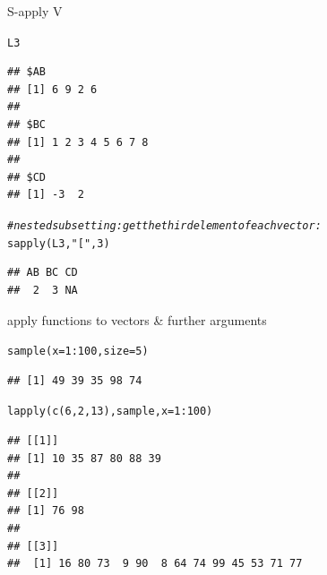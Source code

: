 \documentclass[xcolor=table,       handout,    xcolor=dvipsnames]{beamer}\usepackage[]{graphicx}\usepackage[]{color}
\makeatletter
\newcommand{\hlnum}[1]{\textcolor[rgb]{0,0,0}{#1}}
\newcommand{\hlstr}[1]{\textcolor[rgb]{0.545,0.137,0.137}{#1}}
\newcommand{\hlcom}[1]{\textcolor[rgb]{0,0.392,0}{\textit{#1}}}
\newcommand{\hlopt}[1]{\textcolor[rgb]{0,0,0}{#1}}
\newcommand{\hlstd}[1]{\textcolor[rgb]{0,0,0}{#1}}
\newcommand{\hlkwc}[1]{\textcolor[rgb]{1,0,1}{#1}}
\newcommand{\hlkwd}[1]{\textcolor[rgb]{0,0,1}{#1}}
\newenvironment{kframe}{%
 \def\at@end@of@kframe{}%
 \ifinner\ifhmode%
  \def\at@end@of@kframe{\end{minipage}}%
  \begin{minipage}{\columnwidth}%
 \fi\fi%
 \def\FrameCommand##1{\hskip\@totalleftmargin \hskip-\fboxsep
 \colorbox{shadecolor}{##1}\hskip-\fboxsep
     \hskip-\linewidth \hskip-\@totalleftmargin \hskip\columnwidth}%
 \MakeFramed {\advance\hsize-\width
   \@totalleftmargin\z@ \linewidth\hsize
   \@setminipage}}%
 {\par\unskip\endMakeFramed%
 \at@end@of@kframe}
\newenvironment{knitrout}{}{} %
\makeatother
\begin{document}
\begin{frame}[fragile]{S-apply V}
\begin{knitrout}
\color{fgcolor}\begin{kframe}
\begin{alltt}
\hlstd{L3}
\end{alltt}
\begin{verbatim}
## $AB
## [1] 6 9 2 6
## 
## $BC
## [1] 1 2 3 4 5 6 7 8
## 
## $CD
## [1] -3  2
\end{verbatim}
\begin{alltt}
\hlcom{# nested subsetting: get the third element of each vector:}
\hlkwd{sapply}\hlstd{(L3,} \hlstr{"["}\hlstd{,} \hlnum{3}\hlstd{)}
\end{alltt}
\begin{verbatim}
## AB BC CD 
##  2  3 NA
\end{verbatim}
\end{kframe}
\end{knitrout}
\end{frame}


\begin{frame}[fragile]{apply functions to vectors \& further arguments}
\begin{knitrout}
\color{fgcolor}\begin{kframe}
\begin{alltt}
\hlkwd{sample}\hlstd{(}\hlkwc{x}\hlstd{=}\hlnum{1}\hlopt{:}\hlnum{100}\hlstd{,} \hlkwc{size}\hlstd{=}\hlnum{5}\hlstd{)}
\end{alltt}
\begin{verbatim}
## [1] 49 39 35 98 74
\end{verbatim}
\end{kframe}
\end{knitrout}
\pause
\begin{knitrout}
\color{fgcolor}\begin{kframe}
\begin{alltt}
\hlkwd{lapply}\hlstd{(}\hlkwd{c}\hlstd{(}\hlnum{6}\hlstd{,}\hlnum{2}\hlstd{,}\hlnum{13}\hlstd{), sample,} \hlkwc{x}\hlstd{=}\hlnum{1}\hlopt{:}\hlnum{100}\hlstd{)}
\end{alltt}
\begin{verbatim}
## [[1]]
## [1] 10 35 87 80 88 39
## 
## [[2]]
## [1] 76 98
## 
## [[3]]
##  [1] 16 80 73  9 90  8 64 74 99 45 53 71 77
\end{verbatim}
\end{kframe}
\end{knitrout}
\end{frame}
\end{document}
